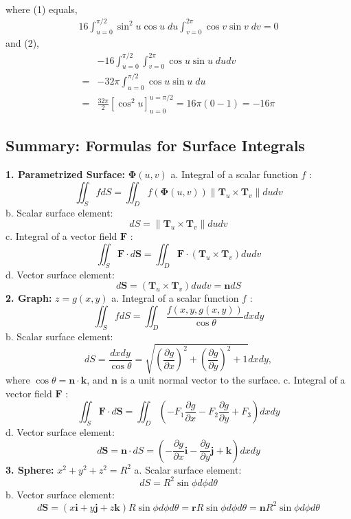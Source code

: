 \documentclass[12pt]{book}
\theoremstyle{definition}
\theoremstyle{remark}
\begin{document}
\begin{example}
\begin{equation*}
\begin{split}
  \end{split}
\end{equation*}
  where (1) equals, 
\begin{equation*}
  \begin{split}
    16 \int_{u= 0}^{\pi /2} \sin^2 u \cos u \; du \int_{v=0}^{2\pi}\cos v \sin v \;dv = 0 
  \end{split}
\end{equation*}
  and (2), 
  \begin{equation*}
    \begin{split}
      &- 16  \int_{u= 0}^{\pi /2} \int_{v=0}^{2\pi} \cos u \sin u \; du dv \\ 
      =& - 32 \pi  \int_{u= 0}^{\pi /2}  \cos u \sin u \; du\\ 
      =& \frac{32 \pi }{2} \left[ \cos^2 u \right]^{u = \pi /2}_{u =0} = 16 \pi (0-1) = -16 \pi 
    \end{split}
  \end{equation*}

  
\end{example}
\subsection{Summary: Formulas for Surface Integrals}%
  \label{sub:Summary: Formulas for Surface Integrals}
\textbf{1. Parametrized Surface:} $\boldsymbol{\Phi}(u, v)$
\newline a. Integral of a scalar function $f$ :
$$
\iint_S f d S=\iint_D f(\boldsymbol{\Phi}(u, v))\left\|\mathbf{T}_u \times \mathbf{T}_v\right\| d u d v
$$
b. Scalar surface element:
$$
d S=\left\|\mathbf{T}_u \times \mathbf{T}_v\right\| d u d v
$$
c. Integral of a vector field $\mathbf{F}$ :
$$
\iint_S \mathbf{F} \cdot d \mathbf{S}=\iint_D \mathbf{F} \cdot\left(\mathbf{T}_u \times \mathbf{T}_v\right) d u d v
$$
d. Vector surface element:
$$
d \mathbf{S}=\left(\mathbf{T}_u \times \mathbf{T}_v\right) d u d v=\mathbf{n} d S
$$
\textbf{2. Graph:} $z=g(x, y)$ \newline 
a. Integral of a scalar function $f$ :
$$
\iint_S f d S=\iint_D \frac{f(x, y, g(x, y))}{\cos \theta} d x d y
$$
b. Scalar surface element:
$$
d S=\frac{d x d y}{\cos \theta}=\sqrt{\left(\frac{\partial g}{\partial x}\right)^2+\left(\frac{\partial g}{\partial y}\right)^2+1} d x d y,
$$
where $\cos \theta=\mathbf{n} \cdot \mathbf{k}$, and $\mathbf{n}$ is a unit normal vector to the surface.
c. Integral of a vector field $\mathbf{F}$ :
$$
\iint_S \mathbf{F} \cdot d \mathbf{S}=\iint_D\left(-F_1 \frac{\partial g}{\partial x}-F_2 \frac{\partial g}{\partial y}+F_3\right) d x d y
$$
d. Vector surface element:
$$
d \mathbf{S}=\mathbf{n} \cdot d S=\left(-\frac{\partial g}{\partial x} \mathbf{i}-\frac{\partial g}{\partial y} \mathbf{j}+\mathbf{k}\right) d x d y
$$
\textbf{3. Sphere:} $x^2+y^2+z^2=R^2$ \newline  
a. Scalar surface element:
$$
d S=R^2 \sin \phi d \phi d \theta
$$
b. Vector surface element:
$$
d \mathbf{S}=(x \mathbf{i}+y \mathbf{j}+z \mathbf{k}) R \sin \phi d \phi d \theta=\mathbf{r} R \sin \phi d \phi d \theta=\mathbf{n} R^2 \sin \phi d \phi d \theta
$$
\end{document}
